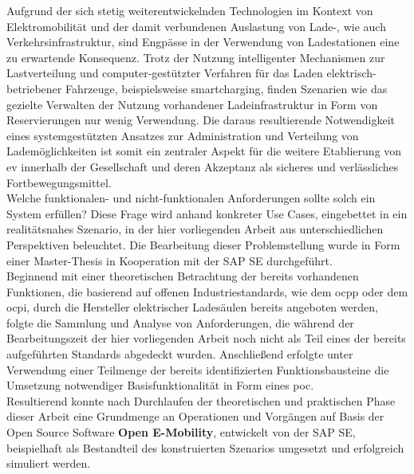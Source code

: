 
\Abstract
Aufgrund der sich stetig weiterentwickelnden Technologien im Kontext von Elektromobilit\"at und der damit verbundenen Auslastung von Lade-, wie auch Verkehrsinfrastruktur, sind Engp\"asse in der Verwendung von Ladestationen eine zu erwartende Konsequenz. 
Trotz der Nutzung intelligenter Mechanismen zur Lastverteilung und computer-gest\"utzter Verfahren f\"ur das Laden elektrisch-betriebener Fahrzeuge, beispielsweise \Gls{smartcharging}, finden Szenarien wie das gezielte Verwalten der Nutzung vorhandener Ladeinfrastruktur in Form von Reservierungen nur wenig Verwendung.
Die daraus resultierende Notwendigkeit eines systemgest\"utzten Ansatzes zur Administration und Verteilung von Ladem\"oglichkeiten ist somit ein zentraler Aspekt f\"ur die weitere Etablierung von \acrfull{ev} innerhalb der Gesellschaft und deren Akzeptanz als sicheres und verl\"assliches Fortbewegungsmittel.\\
Welche funktionalen- und nicht-funktionalen Anforderungen sollte solch ein System erf\"ullen? Diese Frage wird anhand konkreter Use Cases, eingebettet in ein realitätsnahes Szenario, in der hier vorliegenden Arbeit aus unterschiedlichen Perspektiven beleuchtet. 
Die Bearbeitung dieser Problemstellung wurde in Form einer Master-Thesis in Kooperation mit der SAP SE durchgef\"uhrt.\\
Beginnend mit einer theoretischen Betrachtung der bereits vorhandenen Funktionen, die basierend auf offenen Industriestandards, wie dem \acrfull{ocpp} oder dem \acrfull{ocpi}, durch die Hersteller elektrischer Lades\"aulen bereits angeboten werden, folgte die Sammlung und Analyse von Anforderungen, die w\"ahrend der Bearbeitungszeit der hier vorliegenden Arbeit noch nicht als Teil eines der bereits aufgeführten Standards abgedeckt wurden.
Anschließend erfolgte unter Verwendung einer Teilmenge der bereits identifizierten Funktionsbausteine die Umsetzung notwendiger Basisfunktionalität in Form eines \acrshort{poc}.\\
Resultierend konnte nach Durchlaufen der theoretischen und praktischen Phase dieser Arbeit eine Grundmenge an Operationen und Vorg\"angen auf Basis der Open Source Software \textbf{Open E-Mobility}, entwickelt von der SAP SE, beispielhaft als Bestandteil des konstruierten Szenarios umgesetzt und erfolgreich simuliert werden. 
